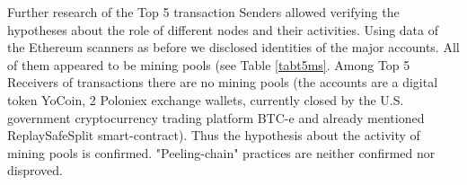 Further research of the Top 5 transaction Senders allowed verifying the hypotheses about the role of different nodes and their activities.
Using data of the Ethereum scanners as before we disclosed identities of the major accounts. 
All of them appeared to be mining pools (see Table \ref{tabt5ms}.
Among Top 5 Receivers of transactions there are no mining pools (the accounts are a digital token YoCoin, 2 Poloniex exchange wallets, currently closed by the U.S. government cryptocurrency trading platform BTC-e and already mentioned ReplaySafeSplit smart-contract).
Thus the hypothesis about the activity of mining pools is confirmed.
"Peeling-chain" practices are neither confirmed nor disproved.







